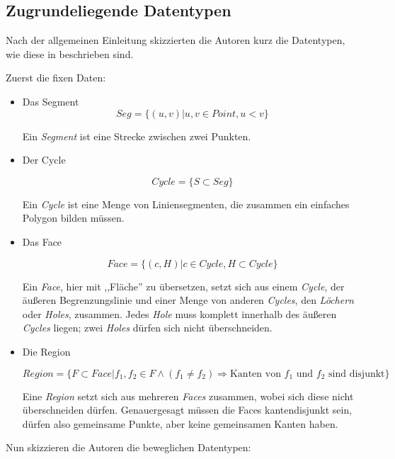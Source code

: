 \subsection{Zugrundeliegende Datentypen}\label{DatenMoving}
Nach der allgemeinen Einleitung skizzierten die Autoren kurz die Datentypen, wie diese in \cite{FGNS} beschrieben sind.

Zuerst die fixen Daten:

\begin{itemize}

\item Das Segment
$$Seg=\{(u,v)|u,v\in Point, u<v\}$$

Ein \textit{Segment} ist eine Strecke zwischen zwei Punkten. 

\item Der Cycle 

$$Cycle=\{S\subset Seg\}$$

Ein \textit{Cycle} ist eine Menge von Liniensegmenten, die zusammen ein einfaches Polygon bilden müssen.

\item Das Face

$$Face=\{(c,H)|c\in Cycle, H \subset Cycle\}$$

Ein \textit{Face}, hier mit ,,Fläche'' zu übersetzen, setzt sich aus einem \textit{Cycle}, der äußeren Begrenzungslinie und einer Menge von anderen \textit{Cycles}, den \textit{Löchern} oder \textit{Holes}, zusammen. Jedes \textit{Hole} muss komplett innerhalb des äußeren \textit{Cycles} liegen; zwei \textit{Holes} dürfen sich nicht überschneiden. 

\item Die Region

$$Region=\{F\subset Face|f_1,f_2\in F \wedge (f_1\neq f_2) \Rightarrow \text{Kanten von }f_1\text{ und } f_2 \text{ sind disjunkt}\}$$

Eine \textit{Region} setzt sich aus mehreren \textit{Faces} zusammen, wobei sich diese nicht überschneiden dürfen. Genauergesagt müssen die Faces kantendisjunkt sein, dürfen also gemeinsame Punkte, aber keine gemeinsamen Kanten haben.
\end{itemize}

Nun skizzieren die Autoren die beweglichen Datentypen:

